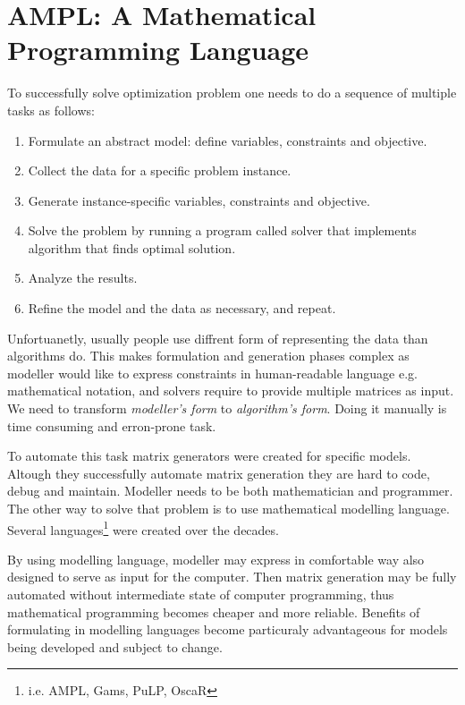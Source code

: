 \section{AMPL: A Mathematical Programming Language}
\label{sec:ampl:ampl}

To successfully solve optimization problem one needs to do a sequence of multiple tasks as follows:

\begin{enumerate}
  \item Formulate an abstract model: define variables, constraints and objective.
  \item Collect the data for a specific problem instance.
  \item Generate instance-specific variables, constraints and objective.
  \item Solve the problem by running a program called solver that implements algorithm that finds optimal solution.
  \item Analyze the results.
  \item Refine the model and the data as necessary, and repeat.
\end{enumerate}

Unfortuanetly, usually people use diffrent form of representing the data than algorithms do. This makes formulation and generation phases complex as modeller would like to express constraints in human-readable language e.g. mathematical notation, and solvers require to provide multiple matrices as input. We need to transform \emph{modeller's form} to \emph{algorithm's form}. Doing it manually is time consuming and erron-prone task.

To automate this task matrix generators were created for specific models. Altough they successfully automate matrix generation they are hard to code, debug and maintain. Modeller needs to be both mathematician and programmer. The other way to solve that problem is to use mathematical modelling language. Several languages\footnote{i.e. AMPL\cite{Fourer2002}, Gams\cite{Gams}, PuLP\cite{PuLP}, OscaR\cite{OscaR}} were created over the decades. 

By using modelling language, modeller may express in comfortable way also designed to serve as input for the computer. Then matrix generation may be fully automated without intermediate state of computer programming, thus mathematical programming becomes cheaper and more reliable. Benefits of formulating in modelling languages become particuraly advantageous for models being developed and subject to change.

